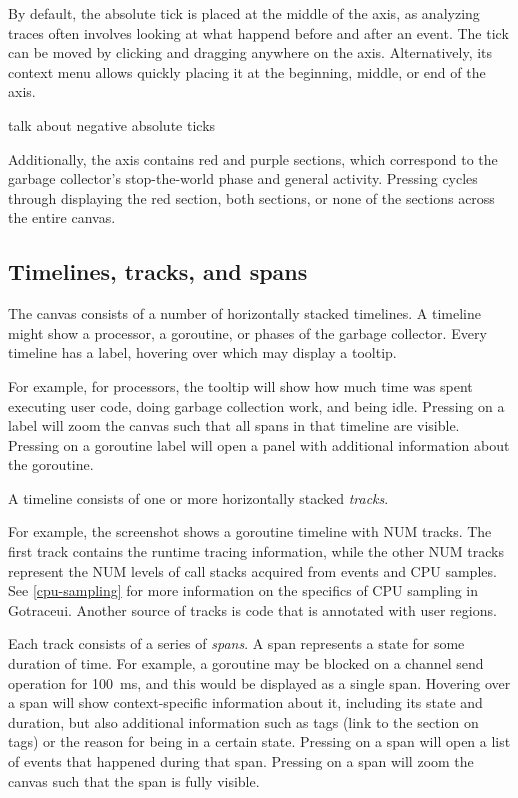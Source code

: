 \documentclass[10pt,letterpaper,oneside,openany,showtrims,draft]{memoir}
\newcommand{\noun}[1]{{\emph{#1}}}
\newcommand{\todo}[1]{{\color{red}#1}}
\newcommand{\shortcut}{\ctrl{} or \cmdmac}
\begin{document}
By default, the absolute tick is placed at the middle of the axis,
as analyzing traces often involves looking at what happend before and after an event.
The tick can be moved by clicking and dragging anywhere on the axis.
Alternatively, its context menu allows quickly placing it at the beginning, middle, or end of the axis.

\todo{talk about negative absolute ticks}

Additionally, the axis contains red and purple sections,
which correspond to the garbage collector's stop-the-world phase and general activity.
Pressing  cycles through displaying the red section, both sections, or none of the sections across the entire canvas.

\subsection{Timelines, tracks, and spans}
The canvas consists of a number of horizontally stacked timelines.
A timeline might show a processor, a goroutine, or phases of the garbage collector.
Every timeline has a label, hovering over which may display a tooltip.


For example, for processors, the tooltip will show how much time was spent executing user code,
doing garbage collection work,
and being idle.
Pressing \keys{\shortcut+LMB} on a label will zoom the canvas such that all spans in that timeline are visible.
Pressing  on a goroutine label will open a panel with additional information about the goroutine.

A timeline consists of one or more horizontally stacked \noun{tracks}.


For example, the screenshot shows a goroutine timeline with \todo{NUM} tracks.
The first track contains the runtime tracing information,
while the other \todo{NUM} tracks represent the \todo{NUM} levels of call stacks acquired from events and CPU samples.
See \autoref{cpu-sampling} for more information on the specifics of CPU sampling in Gotraceui.
Another source of tracks is code that is annotated with user regions.

Each track consists of a series of \noun{spans}.
A span represents a state for some duration of time.
For example, a goroutine may be blocked on a channel send operation for \unit{100 ms}, and this would be displayed as a single span.
Hovering over a span will show context-specific information about it,
including its state and duration,
but also additional information such as tags
\todo{(link to the section on tags})
or the reason for being in a certain state.
Pressing  on a span will open a list of events that happened during that span.
Pressing \keys{\shortcut+LMB} on a span will zoom the canvas such that the span is fully visible.
\end{document}
